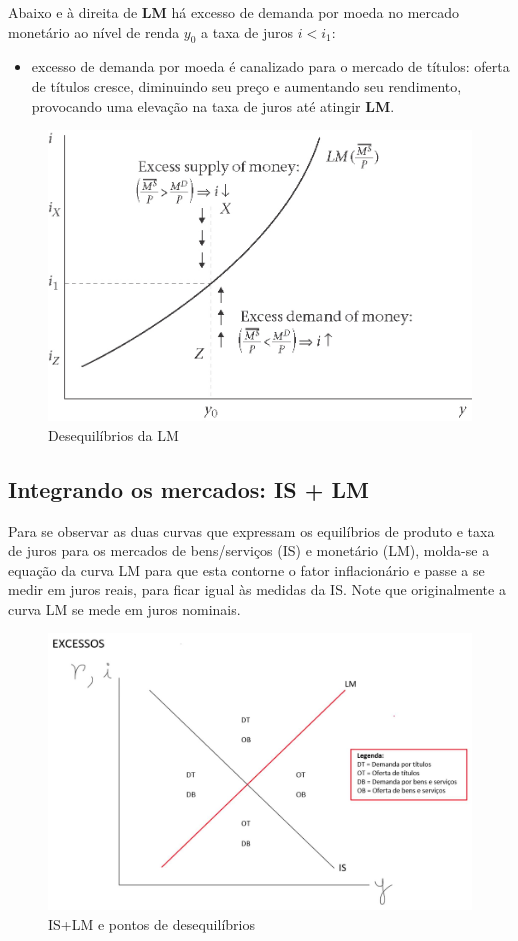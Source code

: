 \documentclass[a4paper,12pt]{article}[abntex2]
\begin{document}
Abaixo e à direita de \textbf{LM} há excesso de demanda por moeda no mercado monetário ao nível de renda $y_0$ a taxa de juros $i < i_1$:\begin{itemize}
    \item excesso de demanda por moeda é canalizado para o mercado de títulos: oferta de títulos cresce, diminuindo seu preço e aumentando seu rendimento, provocando uma elevação na taxa de juros até atingir \textbf{LM}.
\end{itemize}

\begin{figure}[H]
    \centering  
    \caption{Desequilíbrios da LM}
    \includegraphics[width=0.7\linewidth]{Imagens/a3i3.png}
\end{figure}

\subsection{\textbf{Integrando os mercados: IS + LM}}
Para se observar as duas curvas que expressam os equilíbrios de produto e taxa de juros para os mercados de bens/serviços (IS) e monetário (LM), molda-se a equação da curva LM para que esta contorne o fator inflacionário e passe a se medir em juros reais, para ficar igual às medidas da IS. Note que originalmente a curva LM se mede em juros nominais. 

\begin{figure}[H]
    \centering
    \caption{IS+LM e pontos de desequilíbrios}
    \includegraphics[width=0.7\linewidth]{Imagens/a4i1.png}
\end{figure}
\end{document}
